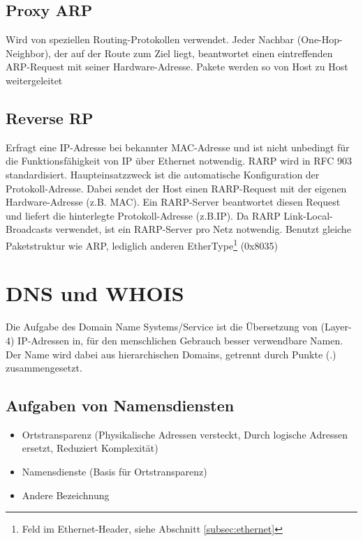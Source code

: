 \documentclass{article} %
\begin{document}
\subsection{Proxy ARP}

Wird von speziellen Routing-Protokollen verwendet.
Jeder Nachbar (One-Hop-Neighbor), der auf der Route zum Ziel liegt, beantwortet einen eintreffenden ARP-Request mit seiner Hardware-Adresse.
Pakete werden so von Host zu Host weitergeleitet

\subsection{Reverse RP}

Erfragt eine IP-Adresse bei bekannter MAC-Adresse und ist nicht unbedingt für die Funktionsfähigkeit von IP über Ethernet notwendig.
RARP wird in RFC 903 \cite{rfc903} standardisiert.
Haupteinsatzzweck ist die automatische Konfiguration der Protokoll-Adresse.
Dabei sendet der Host einen RARP-Request mit der eigenen Hardware-Adresse (z.B. MAC).
Ein RARP-Server beantwortet diesen Request und liefert die hinterlegte Protokoll-Adresse (z.B.IP).
Da RARP Link-Local-Broadcasts verwendet, ist ein RARP-Server pro Netz notwendig.
Benutzt gleiche Paketstruktur wie ARP, lediglich anderen EtherType\footnote{Feld im Ethernet-Header, siehe Abschnitt \ref{subsec:ethernet}} (0x8035)

\section{DNS und WHOIS}

Die Aufgabe des Domain Name Systems/Service ist die Übersetzung von (Layer-4) IP-Adressen in, für den menschlichen Gebrauch besser verwendbare Namen.
Der Name wird dabei aus hierarchischen Domains, getrennt durch Punkte (.) zusammengesetzt.

\subsection{Aufgaben von Namensdiensten}
	\begin{itemize}
	\item Ortstransparenz (Physikalische Adressen versteckt, Durch logische Adressen ersetzt, Reduziert Komplexität)
	\item Namensdienste (Basis für Ortstransparenz)
	\item Andere Bezeichnung
	\end{itemize}
\end{document}
